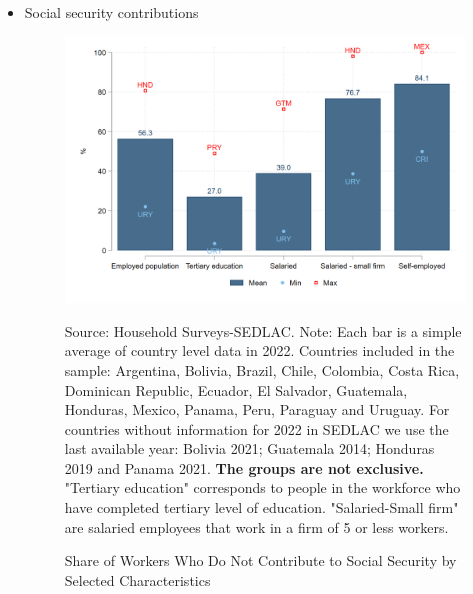 \documentclass[english]{article}
\begin{document}
\begin{itemize}
        \item Social security contributions
                    \begin{figure}[H]
                    \justifying
                    \caption{Share of Workers Who Do Not Contribute to Social Security by Selected Characteristics}
                    \centerline{\includegraphics[scale=.3]{latex/figures/Snapshot/Social security contributions.png}
                    \label{fig:SScontributions}}
                    \footnotesize{Source: Household Surveys-SEDLAC.}
                    \footnotesize{Note: Each bar is a simple average of country level data in 2022. Countries included in the sample: Argentina, Bolivia, Brazil, Chile, Colombia, Costa Rica, Dominican Republic, Ecuador, El Salvador, Guatemala, Honduras, Mexico, Panama, Peru, Paraguay and Uruguay. For countries without information for 2022 in SEDLAC we use the last available year: Bolivia 2021; Guatemala 2014; Honduras 2019 and Panama 2021.
                    \textbf{The groups are not exclusive.} "Tertiary education" corresponds to people in the workforce who have completed tertiary level of education. "Salaried-Small firm" are salaried employees that work in a firm of 5 or less workers.}
            \end{figure}
    

\end{itemize}
\end{document}
